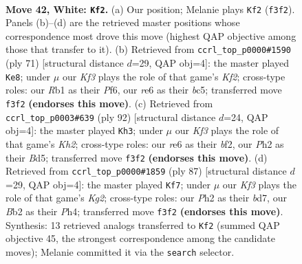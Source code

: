 \documentclass[11pt]{article}
\begin{document}
\clearpage

\begin{figure}[p]\centering
\begin{subfigure}{0.46\textwidth}\centering
\resizebox{\linewidth}{!}{%
\newchessgame
\chessboard[
  setfen={6k1/3n4/4r3/8/p1p5/P1P2KPp/1BP4P/1R6 w - - 1 42},
  showmover=false,
  pgfstyle=straightmove, color=movearrow, markmove={f3-f2}
]}
\caption{}
\end{subfigure}\hfill
\begin{subfigure}{0.46\textwidth}\centering
\resizebox{\linewidth}{!}{%
\newchessgame
\chessboard[
  setfen={8/1p3k1p/p4p2/2BP1b1P/P7/1P3P2/3K4/8 b - - 4 36},
  showmover=false,
  pgfstyle=straightmove, color=movearrow, markmove={f7-e8}
]}
\caption{}
\end{subfigure}
\\[4pt]
\begin{subfigure}{0.46\textwidth}\centering
\resizebox{\linewidth}{!}{%
\newchessgame
\chessboard[
  setfen={8/4k1p1/7p/p2B1p1P/P7/1P6/5bPK/8 w - - 3 47},
  showmover=false,
  pgfstyle=straightmove, color=movearrow, markmove={h2-h3}
]}
\caption{}
\end{subfigure}\hfill
\begin{subfigure}{0.46\textwidth}\centering
\resizebox{\linewidth}{!}{%
\newchessgame
\chessboard[
  setfen={8/3B2k1/4p1p1/4p3/4P2p/2P3bP/3K2P1/8 b - - 0 44},
  showmover=false,
  pgfstyle=straightmove, color=movearrow, markmove={g7-f7}
]}
\caption{}
\end{subfigure}
\caption{\textbf{Move 42, White: \texttt{Kf2}.} (a) Our position; Melanie plays \texttt{Kf2} (\texttt{f3f2}). Panels (b)--(d) are the retrieved master positions whose correspondence most drove this move (highest QAP objective among those that transfer to it). (b) Retrieved from \texttt{ccrl\_top\_p0000\#1590} (ply 71) [structural distance $d$=29, QAP obj=4]: the master played \texttt{Ke8}; under $\mu$ our \emph{Kf3} plays the role of that game's \emph{Kf2}; cross-type roles: our \emph{R}b1 as their \emph{P}f6, our \emph{r}e6 as their \emph{b}c5; transferred move \texttt{f3f2} \textbf{(endorses this move)}. (c) Retrieved from \texttt{ccrl\_top\_p0003\#639} (ply 92) [structural distance $d$=24, QAP obj=4]: the master played \texttt{Kh3}; under $\mu$ our \emph{Kf3} plays the role of that game's \emph{Kh2}; cross-type roles: our \emph{r}e6 as their \emph{b}f2, our \emph{P}h2 as their \emph{B}d5; transferred move \texttt{f3f2} \textbf{(endorses this move)}. (d) Retrieved from \texttt{ccrl\_top\_p0000\#1859} (ply 87) [structural distance $d$=29, QAP obj=4]: the master played \texttt{Kf7}; under $\mu$ our \emph{Kf3} plays the role of that game's \emph{Kg2}; cross-type roles: our \emph{P}h2 as their \emph{b}d7, our \emph{B}b2 as their \emph{P}h4; transferred move \texttt{f3f2} \textbf{(endorses this move)}. Synthesis: 13 retrieved analogs transferred to \texttt{Kf2} (summed QAP objective 45, the strongest correspondence among the candidate moves); Melanie committed it via the \texttt{search} selector.}
\label{fig:thought-m82}
\end{figure}
\end{document}
